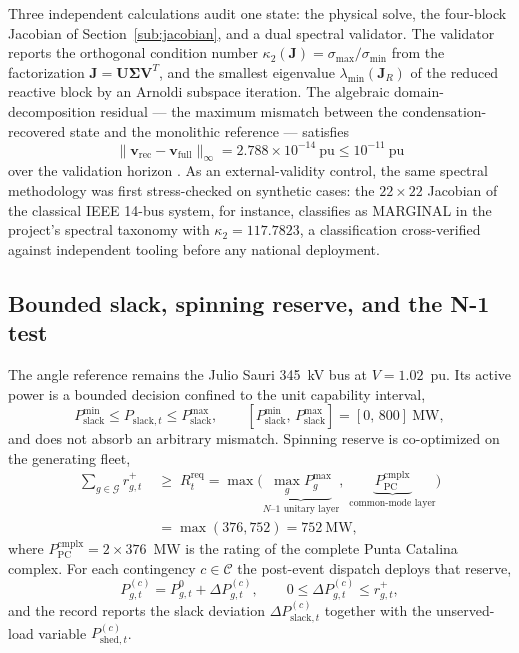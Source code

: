 Three independent calculations audit one state: the physical solve, the four-block Jacobian of Section~\ref{sub:jacobian}, and a dual spectral validator. The validator reports the orthogonal condition number $\kappa_2(\mathbf{J}) = \sigma_{\max} / \sigma_{\min}$ from the factorization $\mathbf{J} = \mathbf{U} \boldsymbol{\Sigma} \mathbf{V}^{T}$, and the smallest eigenvalue $\lambda_{\min}(\mathbf{J}_R)$ of the reduced reactive block by an Arnoldi subspace iteration. The algebraic domain-decomposition residual --- the maximum mismatch between the condensation-recovered state and the monolithic reference --- satisfies
\begin{equation}
\|\mathbf{v}_{\mathrm{rec}} - \mathbf{v}_{\mathrm{full}}\|_\infty = 2.788 \times 10^{-14}\ \mathrm{pu} \le 10^{-11}\ \mathrm{pu}
\label{eq:trinity}
\end{equation}
over the validation horizon \cite{vancutsem1998}. As an external-validity control, the same spectral methodology was first stress-checked on synthetic cases: the $22\times22$ Jacobian of the classical IEEE 14-bus system, for instance, classifies as MARGINAL in the project's spectral taxonomy with $\kappa_2 = 117.7823$, a classification cross-verified against independent tooling before any national deployment.

\subsection{Bounded slack, spinning reserve, and the N-1 test}
\label{sub:n1}

The angle reference remains the Julio Sauri 345~kV bus at $V=1.02$~pu. Its active power is a bounded decision confined to the unit capability interval,
\begin{equation}
P_{\mathrm{slack}}^{\min} \le P_{\mathrm{slack},t} \le P_{\mathrm{slack}}^{\max}, \qquad [P_{\mathrm{slack}}^{\min},\, P_{\mathrm{slack}}^{\max}] = [0,\, 800]~\mathrm{MW},
\label{eq:slackbox}
\end{equation}
and does not absorb an arbitrary mismatch. Spinning reserve is co-optimized on the generating fleet,
\begin{equation}
\begin{aligned}
\sum_{g \in \mathcal{G}} r_{g,t}^{+} \;&\ge\; R_t^{\mathrm{req}}
= \max\bigl(\underbrace{\max_{g} P_g^{\max}}_{\text{$N$--$1$ unitary layer}},\;
\underbrace{P_{\mathrm{PC}}^{\mathrm{cmplx}}}_{\text{common-mode layer}}\bigr)\\
&= \max(376, 752) = 752~\mathrm{MW},
\end{aligned}
\label{eq:reserve}
\end{equation}
where $P_{\mathrm{PC}}^{\mathrm{cmplx}} = 2 \times 376$~MW is the rating of the complete Punta Catalina complex. For each contingency $c \in \mathcal{C}$ the post-event dispatch deploys that reserve,
\begin{equation}
P_{g,t}^{(c)} = P_{g,t}^{0} + \Delta P_{g,t}^{(c)}, \qquad 0 \le \Delta P_{g,t}^{(c)} \le r_{g,t}^{+},
\label{eq:deploy}
\end{equation}
and the record reports the slack deviation $\Delta P_{\mathrm{slack},t}^{(c)}$ together with the unserved-load variable $P_{\mathrm{shed},t}^{(c)}$.

